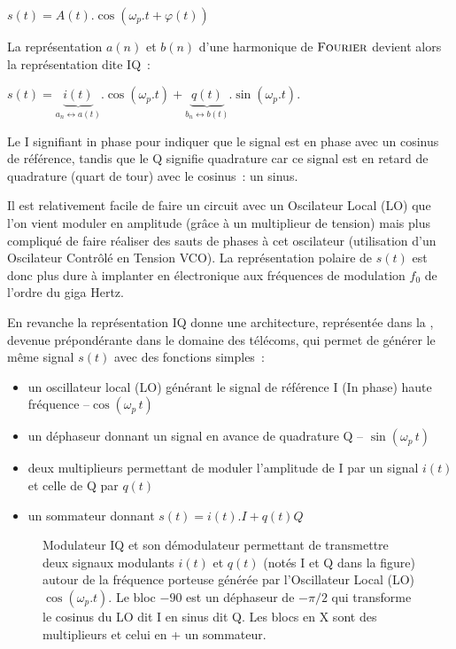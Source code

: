 $s(t) = A(t).\cos(\omega_p.t+\varphi(t))$

La représentation $a(n)$ et $b(n)$ d'une harmonique de $\textsc{Fourier}{}$
devient alors la représentation dite IQ~:

$s(t) = \underbrace{i(t)}_{a_n\leftrightarrow a(t)}.\cos(\omega_p.t) +
\underbrace{q(t)}_{b_n\leftrightarrow b(t)}.\sin(\omega_p.t)$.

Le I signifiant \og{} in phase \fg{} pour indiquer que le signal est
en phase avec un cosinus de référence, tandis que le Q signifie \og{}
quadrature \fg{} car ce signal est en retard de quadrature (quart de
tour) avec le cosinus~: un sinus.


Il est relativement facile de faire un circuit avec un Oscilateur
Local (LO) que l'on vient moduler en amplitude (grâce à un multiplieur
de tension) mais plus compliqué de faire réaliser des sauts de phases
à cet oscilateur (utilisation d'un Oscilateur Contrôlé en Tension
VCO). La représentation polaire de $s(t)$ est donc plus dure à
implanter en électronique aux fréquences de modulation $f_0$ de
l'ordre du giga Hertz.

En revanche la représentation IQ donne une architecture, représentée
dans la , devenue prépondérante dans le
domaine des télécoms, qui permet de générer le même signal $s(t)$ avec
des fonctions simples~:


\begin{itemize}
\item un oscillateur local (LO) générant le signal de référence I (In phase) haute fréquence --$\cos(\omega_p\,t)$
\item un déphaseur donnant un signal en avance de quadrature Q -- $\sin(\omega_p\,t)$
\item deux  multiplieurs  permettant de moduler l'amplitude de I par un signal $i(t)$ et celle de Q par $q(t)$
\item un sommateur donnant $s(t) = i(t) . I + q(t) Q$
\end{itemize}


\begin{figure}[htbp]
  \centering
  \caption{Modulateur IQ et son démodulateur permettant de transmettre
    deux signaux modulants $i(t)$ et $q(t)$ (notés I et Q dans la
    figure) autour de la fréquence porteuse générée par l'Oscillateur
    Local (LO) $\cos(\omega_p.t)$. Le bloc $-90$ est un déphaseur de
    $-\pi/2$ qui transforme le cosinus du LO dit I en sinus dit Q. Les
    blocs en X sont des multiplieurs et celui en + un sommateur.}
  \label{fig:mod_demod_iq}
\end{figure}


